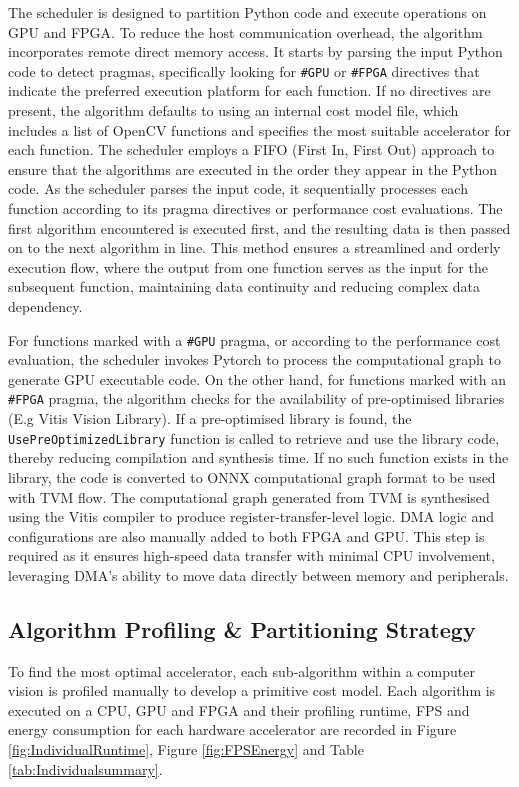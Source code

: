 \documentclass[]{spie}  %
\begin{document}
The scheduler is designed to partition Python code and execute operations on GPU and FPGA. To reduce the host communication overhead, the algorithm incorporates remote direct memory access\cite{xilinx_2019, nvidia_2024}. It starts by parsing the input Python code to detect pragmas, specifically looking for \texttt{\#GPU} or \texttt{\#FPGA} directives that indicate the preferred execution platform for each function. If no directives are present, the algorithm defaults to using an internal cost model file, which includes a list of OpenCV functions and specifies the most suitable accelerator for each function. The scheduler employs a FIFO (First In, First Out) approach to ensure that the algorithms are executed in the order they appear in the Python code. As the scheduler parses the input code, it sequentially processes each function according to its pragma directives or performance cost evaluations. The first algorithm encountered is executed first, and the resulting data is then passed on to the next algorithm in line. This method ensures a streamlined and orderly execution flow, where the output from one function serves as the input for the subsequent function, maintaining data continuity and reducing complex data dependency.

For functions marked with a \texttt{\#GPU} pragma, or according to the performance cost evaluation, the scheduler invokes Pytorch to process the computational graph to generate GPU executable code.
On the other hand, for functions marked with an \texttt{\#FPGA} pragma, the algorithm checks for the availability of pre-optimised libraries (E.g Vitis Vision Library). If a pre-optimised library is found, the \texttt{UsePreOptimizedLibrary} function is called to retrieve and use the library code, thereby reducing compilation and synthesis time. If no such function exists in the library, the code is converted to ONNX computational graph format to be used with TVM flow. The computational graph generated from TVM is synthesised using the Vitis compiler to produce register-transfer-level logic.
DMA logic and configurations are also manually added to both FPGA and GPU. This step is required as it ensures high-speed data transfer with minimal CPU involvement, leveraging DMA's ability to move data directly between memory and peripherals. 

\subsection{Algorithm Profiling \& Partitioning Strategy}
To find the most optimal accelerator, each sub-algorithm within a computer vision is profiled manually to develop a primitive cost model. Each algorithm is executed on a CPU, GPU and FPGA and their profiling runtime, FPS and energy consumption for each hardware accelerator are recorded in Figure \ref{fig:IndividualRuntime}, Figure \ref{fig:FPSEnergy} and Table \ref{tab:Individualsummary}. 
\end{document}
